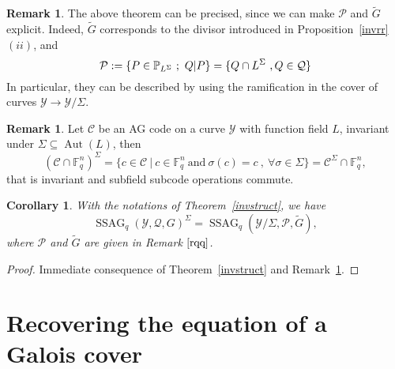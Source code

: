 \documentclass[10pt]{article}
\newtheorem{coro1}[thm]{Corollary}
\theoremstyle{definition}
\newtheorem{rq1}[thm]{Remark}
\theoremstyle{definition}
\theoremstyle{definition}
\newcommand{\PP}{\mathbb{P}}
\newcommand{\Fq}{\mathbb{F}_q}
\newcommand{\su}{\subseteq}
\newcommand{\Y}{\mathcal{Y}}
\newcommand{\PR}{\mathcal{P}}
\newcommand{\QR}{\mathcal{Q}}
\newcommand{\Aut}{\operatorname{Aut}}
\newcommand{\ssag}{\operatorname{SSAG}}
\begin{document}
\begin{rq1} \label{rqq}
The above theorem can be precised, since we can make $\PR$ and $\tilde{G}$ explicit. Indeed, $\tilde{G}$ corresponds to the divisor introduced in Proposition~\ref{invrr} $(ii)$, and \[\PR := \\ \{P \in \PP_{L^{\Sigma}} \ ; \ Q|P\} = \{Q \cap L^{\Sigma} \ , Q \in \QR\} \] In particular, they can be described by using the ramification in the cover of curves $\Y \longrightarrow \Y/\Sigma$.
\end{rq1}

\begin{rq1} \label{commute}
Let $\mathcal{C}$ be an AG code on a curve $\Y$ with function field $L$, invariant under $\Sigma \su \Aut(L)$, then
\[(\mathcal{C}\cap \Fq^n)^{\Sigma} = \{c \in \mathcal{C} \ | \ c \in \Fq^n \ \textrm{and} \ \sigma(c)=c \ , \ \forall \sigma \in \Sigma\} = \mathcal{C}^{\Sigma} \cap \Fq^n,\]
that is invariant and subfield subcode operations commute.
\end{rq1}

\begin{coro1} \label{ssag}
With the notations of Theorem~\ref{invstruct}, we have
\[\ssag_q(\Y,\QR,G)^{\Sigma} = \ssag_q(\Y/\Sigma,\PR,\tilde{G}),\]
where $\PR$ and $\tilde{G}$ are given in Remark $\ref{rqq}$.
\end{coro1}

\begin{proof}
Immediate consequence of Theorem~\ref{invstruct} and Remark~\ref{commute}.
\end{proof}


\section{Recovering the equation of a Galois cover} \label{sectionfour}
\end{document}
